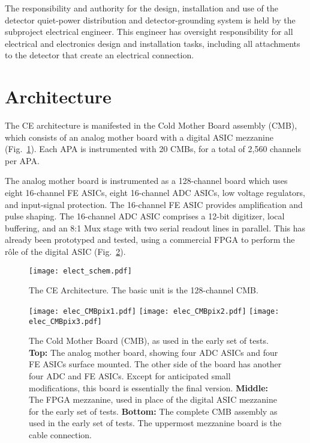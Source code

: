 The responsibility and authority for the design, installation 
and use of the detector quiet-power distribution and 
detector-grounding system is held by the subproject electrical engineer. 
This engineer has oversight responsibility for all electrical and electronics 
design and installation tasks, including all attachments to the detector 
that create an electrical connection. 

%
\section{Architecture}
\label{sec:fe_arch}

The CE architecture is manifested in the Cold Mother Board assembly (CMB),
which consists of an analog mother board with a digital ASIC mezzanine (Fig.~\ref{fig:elect_schem}).
Each APA is instrumented with 20 CMBs, for a total of 2,560 channels per APA.

The analog mother board is instrumented as a 128-channel board which uses eight 16-channel FE ASICs,
eight 16-channel ADC ASICs, low voltage regulators, and input-signal protection.
The 16-channel FE ASIC provides amplification and pulse shaping.
The 16-channel ADC ASIC comprises a 12-bit digitizer, local buffering,
and an 8:1 Mux stage with two serial readout lines in parallel.
This has already been prototyped and tested,
using a commercial FPGA to perform the r\^ole of the digital ASIC (Fig.~\ref{fig:elec_CMBpix}).

\begin{figure}[htbp]
\centering
\texttt{[image: elect\_schem.pdf]}
\caption{
  The CE Architecture.
  The basic unit is the 128-channel CMB.
}
\label{fig:elect_schem}
\end{figure}

\begin{figure}[htbp]
\centering
\texttt{[image: elec\_CMBpix1.pdf]}
\texttt{[image: elec\_CMBpix2.pdf]}
\texttt{[image: elec\_CMBpix3.pdf]}
\caption{
  The Cold Mother Board (CMB), as used in the early set of tests.
  {\bf Top:} The analog mother board, showing four ADC ASICs and four FE ASICs surface mounted.
  The other side of the board has another four ADC and FE ASICs.
  Except for anticipated small modifications, this board is essentially the final version.
  {\bf Middle:} The FPGA mezzanine, used in place of the digital ASIC mezzanine for the early set of tests.
  {\bf Bottom:} The complete CMB assembly as used in the early set of tests.
  The uppermost mezzanine board is the cable connection.
}
\label{fig:elec_CMBpix}
\end{figure}

